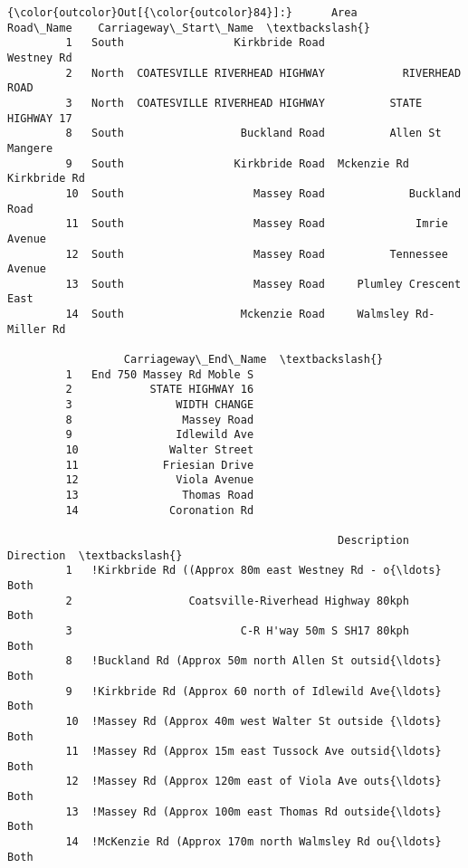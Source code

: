 \documentclass[11pt]{article}
\begin{document}
\begin{Verbatim}[commandchars=\\\{\}]
{\color{outcolor}Out[{\color{outcolor}84}]:}      Area                      Road\_Name    Carriageway\_Start\_Name  \textbackslash{}
         1   South                 Kirkbride Road                Westney Rd   
         2   North  COATESVILLE RIVERHEAD HIGHWAY            RIVERHEAD ROAD   
         3   North  COATESVILLE RIVERHEAD HIGHWAY          STATE HIGHWAY 17   
         8   South                  Buckland Road          Allen St Mangere   
         9   South                 Kirkbride Road  Mckenzie Rd Kirkbride Rd   
         10  South                    Massey Road             Buckland Road   
         11  South                    Massey Road              Imrie Avenue   
         12  South                    Massey Road          Tennessee Avenue   
         13  South                    Massey Road     Plumley Crescent East   
         14  South                  Mckenzie Road     Walmsley Rd-Miller Rd   
         
                  Carriageway\_End\_Name  \textbackslash{}
         1   End 750 Massey Rd Moble S   
         2            STATE HIGHWAY 16   
         3                WIDTH CHANGE   
         8                 Massey Road   
         9                Idlewild Ave   
         10              Walter Street   
         11             Friesian Drive   
         12               Viola Avenue   
         13                Thomas Road   
         14              Coronation Rd   
         
                                                   Description Direction  \textbackslash{}
         1   !Kirkbride Rd ((Approx 80m east Westney Rd - o{\ldots}      Both   
         2                  Coatsville-Riverhead Highway 80kph      Both   
         3                          C-R H'way 50m S SH17 80kph      Both   
         8   !Buckland Rd (Approx 50m north Allen St outsid{\ldots}      Both   
         9   !Kirkbride Rd (Approx 60 north of Idlewild Ave{\ldots}      Both   
         10  !Massey Rd (Approx 40m west Walter St outside {\ldots}      Both   
         11  !Massey Rd (Approx 15m east Tussock Ave outsid{\ldots}      Both   
         12  !Massey Rd (Approx 120m east of Viola Ave outs{\ldots}      Both   
         13  !Massey Rd (Approx 100m east Thomas Rd outside{\ldots}      Both   
         14  !McKenzie Rd (Approx 170m north Walmsley Rd ou{\ldots}      Both   
         

\end{Verbatim}
\end{document}
